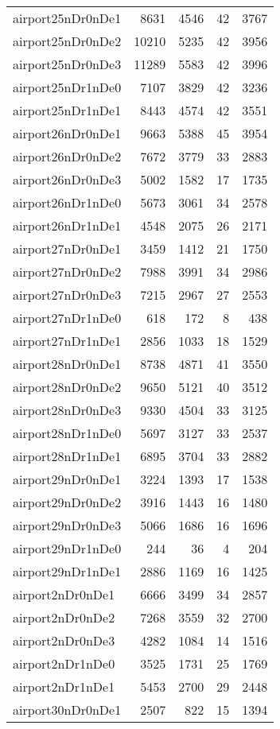 \begin{longtable}{lrrrr}
airport25nDr0nDe1 & 8631 & 4546 & 42 & 3767 \\
airport25nDr0nDe2 & 10210 & 5235 & 42 & 3956 \\
airport25nDr0nDe3 & 11289 & 5583 & 42 & 3996 \\
airport25nDr1nDe0 & 7107 & 3829 & 42 & 3236 \\
airport25nDr1nDe1 & 8443 & 4574 & 42 & 3551 \\
airport26nDr0nDe1 & 9663 & 5388 & 45 & 3954 \\
airport26nDr0nDe2 & 7672 & 3779 & 33 & 2883 \\
airport26nDr0nDe3 & 5002 & 1582 & 17 & 1735 \\
airport26nDr1nDe0 & 5673 & 3061 & 34 & 2578 \\
airport26nDr1nDe1 & 4548 & 2075 & 26 & 2171 \\
airport27nDr0nDe1 & 3459 & 1412 & 21 & 1750 \\
airport27nDr0nDe2 & 7988 & 3991 & 34 & 2986 \\
airport27nDr0nDe3 & 7215 & 2967 & 27 & 2553 \\
airport27nDr1nDe0 & 618 & 172 & 8 & 438 \\
airport27nDr1nDe1 & 2856 & 1033 & 18 & 1529 \\
airport28nDr0nDe1 & 8738 & 4871 & 41 & 3550 \\
airport28nDr0nDe2 & 9650 & 5121 & 40 & 3512 \\
airport28nDr0nDe3 & 9330 & 4504 & 33 & 3125 \\
airport28nDr1nDe0 & 5697 & 3127 & 33 & 2537 \\
airport28nDr1nDe1 & 6895 & 3704 & 33 & 2882 \\
airport29nDr0nDe1 & 3224 & 1393 & 17 & 1538 \\
airport29nDr0nDe2 & 3916 & 1443 & 16 & 1480 \\
airport29nDr0nDe3 & 5066 & 1686 & 16 & 1696 \\
airport29nDr1nDe0 & 244 & 36 & 4 & 204 \\
airport29nDr1nDe1 & 2886 & 1169 & 16 & 1425 \\
airport2nDr0nDe1 & 6666 & 3499 & 34 & 2857 \\
airport2nDr0nDe2 & 7268 & 3559 & 32 & 2700 \\
airport2nDr0nDe3 & 4282 & 1084 & 14 & 1516 \\
airport2nDr1nDe0 & 3525 & 1731 & 25 & 1769 \\
airport2nDr1nDe1 & 5453 & 2700 & 29 & 2448 \\
airport30nDr0nDe1 & 2507 & 822 & 15 & 1394 \\

\end{longtable}
